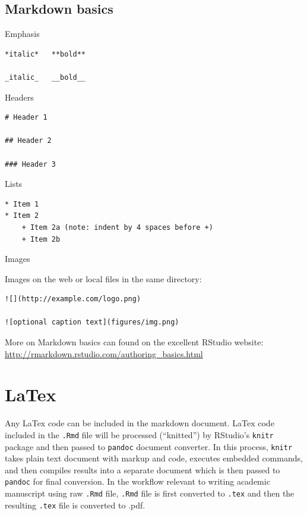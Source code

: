 \documentclass[]{book}
\begin{document}
\subsection{Markdown basics}\label{markdown-basics}

Emphasis

\begin{verbatim}
*italic*   **bold**

_italic_   __bold__
\end{verbatim}

Headers

\begin{verbatim}
# Header 1

## Header 2

### Header 3
\end{verbatim}

Lists

\begin{verbatim}
* Item 1
* Item 2
    + Item 2a (note: indent by 4 spaces before +)
    + Item 2b
\end{verbatim}

Images

Images on the web or local files in the same directory:

\begin{verbatim}
![](http://example.com/logo.png)

![optional caption text](figures/img.png)
\end{verbatim}

More on Markdown basics can found on the excellent RStudio website:
\url{http://rmarkdown.rstudio.com/authoring_basics.html}

\section{LaTex}\label{latex}

Any LaTex code can be included in the markdown document. LaTex code
included in the \texttt{.Rmd} file will be processed (``knitted'') by
RStudio's \texttt{knitr} package and then passed to \texttt{pandoc}
document converter. In this process, \texttt{knitr} takes plain text
document with markup and code, executes embedded commands, and then
compiles results into a separate document which is then passed to
\texttt{pandoc} for final conversion. In the workflow relevant to
writing academic manuscript using raw \texttt{.Rmd} file, \texttt{.Rmd}
file is first converted to \texttt{.tex} and then the resulting
\texttt{.tex} file is converted to .pdf.
\end{document}
